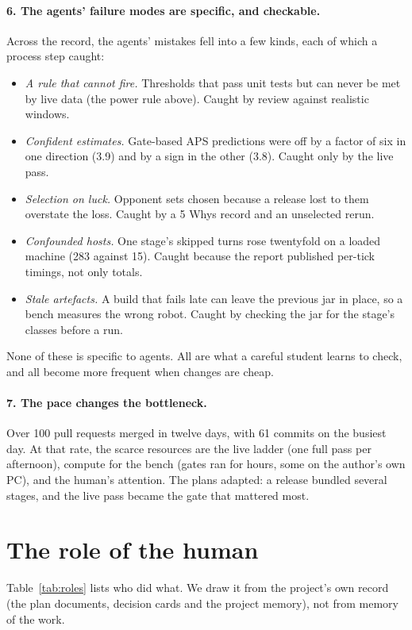 \documentclass[10pt,twocolumn]{article}
\begin{document}
\paragraph{6. The agents' failure modes are specific, and checkable.} Across the record, the
agents' mistakes fell into a few kinds, each of which a process step caught:
\begin{itemize}
\item \emph{A rule that cannot fire.} Thresholds that pass unit tests but can never be met by live
  data (the power rule above). Caught by review against realistic windows.
\item \emph{Confident estimates.} Gate-based APS predictions were off by a factor of six in one
  direction (3.9) and by a sign in the other (3.8). Caught only by the live pass.
\item \emph{Selection on luck.} Opponent sets chosen because a release lost to them overstate the
  loss. Caught by a 5 Whys record and an unselected rerun.
\item \emph{Confounded hosts.} One stage's skipped turns rose twentyfold on a loaded machine
  (283 against 15). Caught because the report published per-tick timings, not only totals.
\item \emph{Stale artefacts.} A build that fails late can leave the previous jar in place, so a
  bench measures the wrong robot. Caught by checking the jar for the stage's classes before a run.
\end{itemize}
None of these is specific to agents. All are what a careful student learns to check, and all
become more frequent when changes are cheap.

\paragraph{7. The pace changes the bottleneck.} Over 100 pull requests merged in twelve days, with
61 commits on the busiest day. At that rate, the scarce resources are the live ladder (one full
pass per afternoon), compute for the bench (gates ran for hours, some on the author's own PC), and
the human's attention. The plans adapted: a release bundled several stages, and the live pass
became the gate that mattered most.

\section{The role of the human}\label{sec:human}

Table~\ref{tab:roles} lists who did what. We draw it from the project's own record (the plan
documents, decision cards and the project memory), not from memory of the work.
\end{document}
